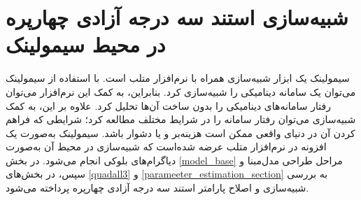 \chapter{شبیه‌سازی استند سه درجه آزادی چهارپره در محیط سیمولینک}
سیمولینک یک ابزار شبیه‌سازی همراه با نرم‌افزار متلب است.
با استفاده از سیمولینک می‌توان یک سامانه دینامیکی را شبیه‌سازی کرد. بنابراین، به کمک این نرم‌افزار می‌توان رفتار سامانه‌های دینامیکی را بدون ساخت آن‌ها تحلیل کرد. علاوه بر این، به کمک شبیه‌سازی می‌توان رفتار سامانه را در شرایط مختلف مطالعه کرد؛ شرایطی که فراهم کردن آن در دنیای واقعی ممکن است هزینه‌بر و  یا دشوار باشد. سیمولینک به‌صورت یک افزونه در نرم‌افزار متلب عرضه شده‌است که شبیه‌سازی در محیط آن به‌صورت دیاگرام‌های بلوکی انجام می‌شود. 
در بخش
\ref{model_base}
 مراحل طراحی مدل‌مبنا و سپس، در بخش‌های
\ref{quadall3}
و
\ref{parameeter_estimation_section}
به بررسی شبیه‌سازی و اصلاح پارامتر استند سه درجه آزادی چهارپره پرداخته می‌شود.